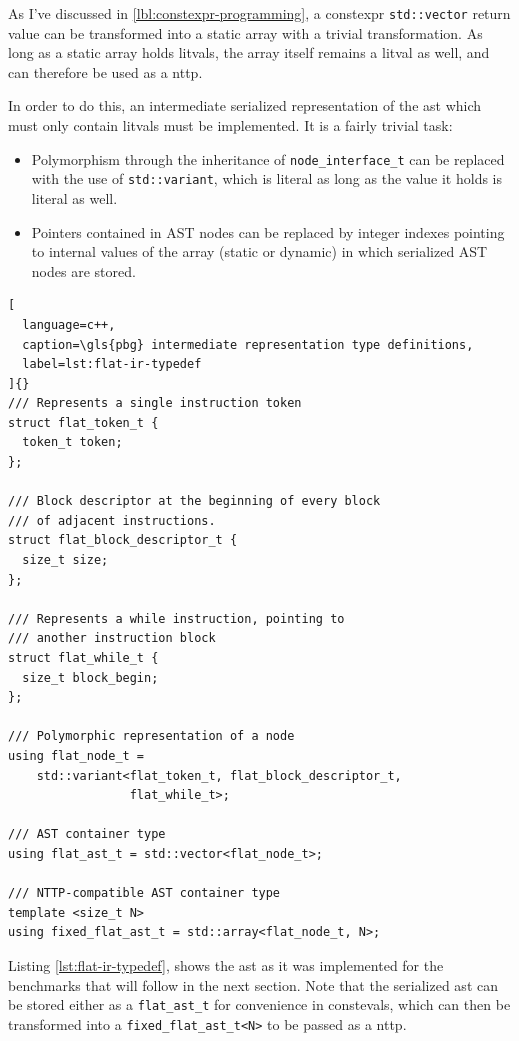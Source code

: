 \documentclass[../main]{subfiles}
\begin{document}
As I've discussed in \ref{lbl:constexpr-programming}, a \gls{constexpr}
\lstinline{std::vector} return value can be transformed into a static array with
a trivial transformation. As long as a static array holds \glspl{litval},
the array itself remains a \gls{litval} as well, and can therefore be used
as a \gls{nttp}.

In order to do this, an intermediate serialized representation of the \gls{ast}
which must only contain \glspl{litval} must be implemented.
It is a fairly trivial task:

\begin{itemize}
\item
Polymorphism through the inheritance of \lstinline{node_interface_t}
can be replaced with the use of \lstinline{std::variant}, which is literal
as long as the value it holds is literal as well.

\item
Pointers contained in AST nodes can be replaced by integer indexes pointing to
internal values of the array (static or dynamic) in which serialized
AST nodes are stored.
\end{itemize}

\begin{lstlisting}[
  language=c++,
  caption=\gls{pbg} intermediate representation type definitions,
  label=lst:flat-ir-typedef
]{}
/// Represents a single instruction token
struct flat_token_t {
  token_t token;
};

/// Block descriptor at the beginning of every block
/// of adjacent instructions.
struct flat_block_descriptor_t {
  size_t size;
};

/// Represents a while instruction, pointing to
/// another instruction block
struct flat_while_t {
  size_t block_begin;
};

/// Polymorphic representation of a node
using flat_node_t =
    std::variant<flat_token_t, flat_block_descriptor_t,
                 flat_while_t>;

/// AST container type
using flat_ast_t = std::vector<flat_node_t>;

/// NTTP-compatible AST container type
template <size_t N>
using fixed_flat_ast_t = std::array<flat_node_t, N>;
\end{lstlisting}

Listing \ref{lst:flat-ir-typedef}, shows the \gls{ast} as it was implemented
for the benchmarks that will follow in the next section.
Note that the serialized \gls{ast} can be stored either as a
\lstinline{flat_ast_t} for convenience in \glspl{consteval},
which can then be transformed into a \lstinline{fixed_flat_ast_t<N>}
to be passed as a \gls{nttp}.
\end{document}
